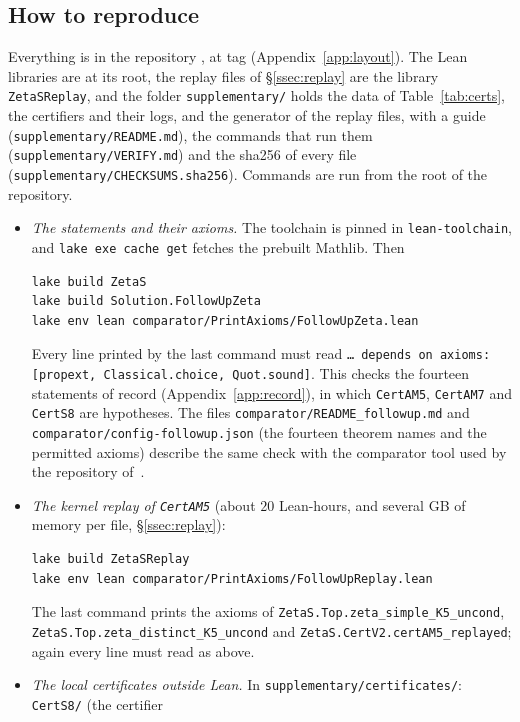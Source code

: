 \subsection{How to reproduce}\label{ssec:reproduce}
\sloppy
{\raggedright Everything is in the repository \repourl, at tag \repotag{} (Appendix~\ref{app:layout}). The Lean libraries are at its root, the replay
files of \S\ref{ssec:replay} are the library \texttt{ZetaSReplay}, and the folder \texttt{supplementary/} holds the data of
Table~\ref{tab:certs}, the certifiers and their logs, and the generator of the replay files, with a guide (\texttt{supplementary/README.md}),
the commands that run them (\texttt{supplementary/VERIFY.md}) and the sha256 of every file
(\texttt{supplementary/CHECKSUMS.sha256}). Commands are run from the root of the repository.\par}
\begin{itemize}\raggedright
\item \emph{The statements and their axioms.} The toolchain is pinned in \texttt{lean-toolchain}, and
\texttt{lake exe cache get} fetches the prebuilt Mathlib. Then
\begin{Verbatim}[fontsize=\small,xleftmargin=1em]
lake build ZetaS
lake build Solution.FollowUpZeta
lake env lean comparator/PrintAxioms/FollowUpZeta.lean
\end{Verbatim}
Every line printed by the last command must read \texttt{\ldots{} depends on axioms: [propext, Classical.choice, Quot.sound]}. This checks
the fourteen statements of record (Appendix~\ref{app:record}), in which \texttt{CertAM5}, \texttt{CertAM7} and \texttt{CertS8} are
hypotheses. The files \texttt{comparator/README\_followup.md} and \texttt{comparator/config-followup.json} (the fourteen theorem names and
the permitted axioms) describe the same check with the comparator tool used by the repository of~\cite{AF}.
\item \emph{The kernel replay of \texttt{CertAM5}} (about $20$ Lean-hours, and several GB of memory per file, \S\ref{ssec:replay}):
\begin{Verbatim}[fontsize=\small,xleftmargin=1em]
lake build ZetaSReplay
lake env lean comparator/PrintAxioms/FollowUpReplay.lean
\end{Verbatim}
The last command prints the axioms of \texttt{ZetaS.Top.zeta\_simple\_K5\_uncond}, \texttt{ZetaS.Top.zeta\_distinct\_K5\_uncond} and
\texttt{ZetaS.CertV2.certAM5\_replayed}; again every line must read as above.
\item \emph{The local certificates outside Lean.} In \texttt{supplementary/certificates/}: \texttt{CertS8/} (the certifier

\end{itemize}

